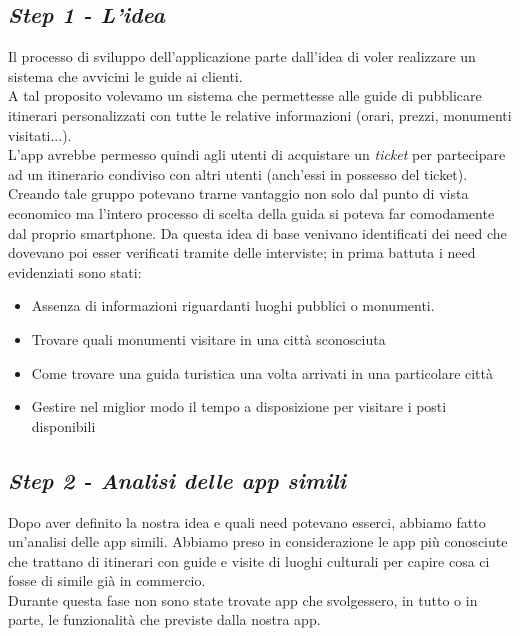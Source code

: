\subsection{\emph{Step 1 - L'idea}}
Il processo di sviluppo dell'applicazione parte dall'idea di voler realizzare un sistema che avvicini le guide ai clienti.\\
A tal proposito volevamo un sistema che permettesse alle guide di pubblicare itinerari personalizzati con tutte le relative informazioni (orari, prezzi, monumenti visitati...).\\
L'app avrebbe permesso quindi agli utenti di acquistare un \emph{ticket} per partecipare ad un itinerario condiviso con altri utenti (anch'essi in possesso del ticket). Creando tale gruppo potevano trarne vantaggio non solo dal punto di vista economico ma l'intero processo di scelta della guida si poteva far comodamente dal proprio smartphone.
Da questa idea di base venivano identificati dei need che dovevano poi esser verificati tramite delle interviste; in prima battuta i need evidenziati sono stati:
\begin{itemize}
	\item Assenza di informazioni riguardanti luoghi pubblici o monumenti.
	\item Trovare quali monumenti visitare in una città sconosciuta 
	\item Come trovare una guida turistica una volta arrivati in una particolare città
	\item Gestire nel miglior modo il tempo a disposizione per visitare i posti disponibili
\end{itemize}
\subsection{\emph{Step 2 - Analisi delle app simili}} %
Dopo aver definito la nostra idea e quali need potevano esserci, abbiamo fatto un'analisi delle app simili. Abbiamo preso in considerazione le app più conosciute che trattano di itinerari con guide e visite di luoghi culturali per capire cosa ci fosse di simile già in commercio.\\
Durante questa fase non sono state trovate app che svolgessero, in tutto o in parte, le funzionalità che previste dalla nostra app.
